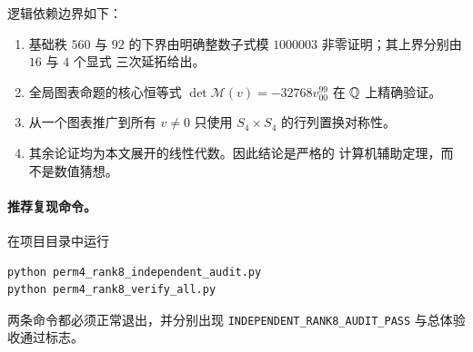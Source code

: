 逻辑依赖边界如下：
\begin{enumerate}[label=(\arabic*)]
  \item 基础秩 \(560\) 与 \(92\) 的下界由明确整数子式模
  \(1000003\) 非零证明；其上界分别由 \(16\) 与 \(4\) 个显式
  三次延拓给出。
  \item 全局图表命题的核心恒等式
  \(\det\mathcal M(v)=-32768v_{00}^{99}\) 在 \(\mathbb Q\) 上精确验证。
  \item 从一个图表推广到所有 \(v\neq0\) 只使用
  \(S_4\times S_4\) 的行列置换对称性。
  \item 其余论证均为本文展开的线性代数。因此结论是严格的
  计算机辅助定理，而不是数值猜想。
\end{enumerate}

\paragraph{推荐复现命令。}
在项目目录中运行
\begin{verbatim}
python perm4_rank8_independent_audit.py
python perm4_rank8_verify_all.py
\end{verbatim}
两条命令都必须正常退出，并分别出现
\texttt{INDEPENDENT\_RANK8\_AUDIT\_PASS} 与总体验收通过标志。
\endgroup
